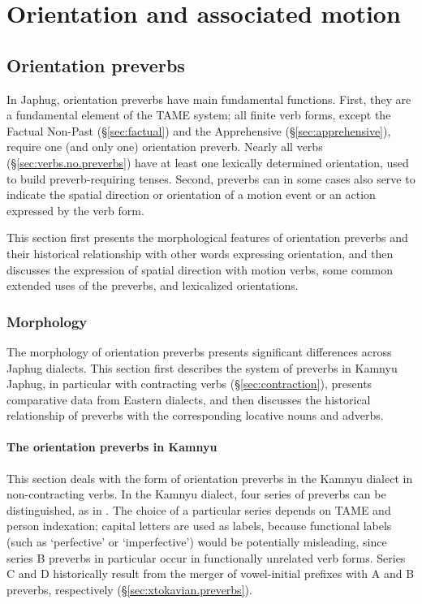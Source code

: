\chapter{Orientation and associated motion} \label{chap:orientation.AM}

\section{Orientation preverbs} \label{sec:orientation.preverbs}
In Japhug, orientation preverbs have main fundamental functions. First, they are a fundamental element of the TAME system; all finite verb forms, except the Factual Non-Past (§\ref{sec:factual}) and the Apprehensive (§\ref{sec:apprehensive}), require one (and only one) orientation preverb. Nearly all verbs (§\ref{sec:verbs.no.preverbs}) have at least one lexically determined orientation, used to build preverb-requiring tenses. Second, preverbs can in some cases also serve to indicate the spatial direction or orientation of a motion event or an action expressed by the verb form.

This section first presents the morphological features of orientation preverbs and their historical relationship with other words expressing orientation, and then discusses the expression of spatial direction with motion verbs, some common extended uses of the preverbs, and lexicalized orientations.

\subsection{Morphology}
The morphology of orientation preverbs presents significant differences across Japhug dialects. This section first describes the system of preverbs in Kamnyu Japhug, in particular with contracting verbs (§\ref{sec:contraction}), presents comparative data from Eastern dialects, and then discusses the historical relationship of preverbs with the corresponding locative nouns and adverbs.

\subsubsection{The orientation preverbs in Kamnyu} \label{sec:kamnyu.preverbs}
This section deals with the form of orientation preverbs in the Kamnyu dialect in non-contracting verbs. In the Kamnyu dialect, four series of preverbs can be distinguished, as in . The choice of a particular series depends on TAME and person indexation; capital letters are used as labels, because functional labels (such as `perfective' or `imperfective') would be potentially misleading, since series B preverbs in particular occur in functionally unrelated verb forms. Series C and D historically result from the merger of vowel-initial prefixes with A and B preverbs, respectively (§\ref{sec:xtokavian.preverbs}).

